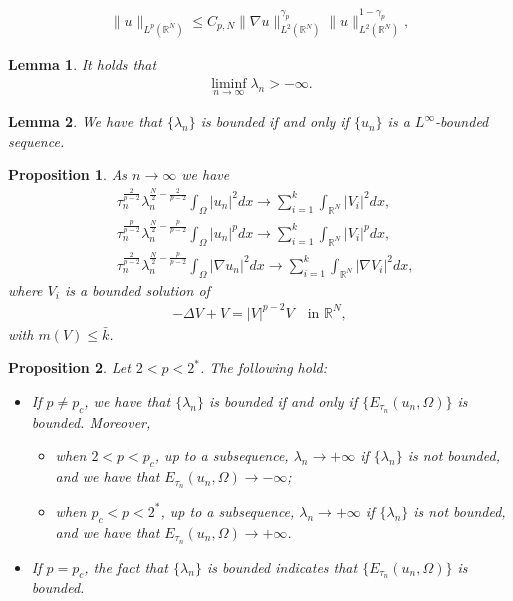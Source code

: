 \documentclass[10pt,a4paper]{amsart}
\newtheorem{lemma}{Lemma}
\newtheorem{proposition}{Proposition}
\newcommand{\R}{\mathbb{R}}
\newcommand{\ga}{\gamma}
\newcommand{\la}{\lambda}
\begin{document}
\begin{align} \label{eqgninequality}
	\|u\|_{L^p(\R^N)} \le C_{p,N}\|\nabla u\|_{L^2(\R^N)}^{\ga_p} \|u\|_{L^2(\R^N)}^{1-\ga_p},
\end{align}

\begin{lemma} \label{lemlanbelow}
	It holds that
	\begin{align*}
		\liminf_{n \to \infty}\la_n > -\infty.
	\end{align*}
\end{lemma}

\begin{lemma} \label{lemlanbounded}
	We have that $\{\la_n\}$ is bounded if and only if $\{u_n\}$ is a $L^\infty$-bounded sequence.
\end{lemma}

\begin{proposition} \label{propasm}
	As $n \to \infty$ we have
	\begin{align}
		& \tau_n^{\frac{2}{p-2}}\la_n^{\frac{N}{2} - \frac{2}{p-2}} \int_\Omega |u_n|^2dx \to \sum_{i = 1}^{k}\int_{\R^N} |V_i|^2dx, \label{eqntoinftyun2} \\
		& \tau_n^{\frac{p}{p-2}}\la_n^{\frac{N}{2} - \frac{p}{p-2}} \int_\Omega |u_n|^pdx \to \sum_{i = 1}^{k}\int_{\R^N} |V_i|^pdx, \\
		& \tau_n^{\frac{2}{p-2}}\la_n^{\frac{N}{2} - \frac{p}{p-2}}\int_\Omega |\nabla u_n|^2dx \to \sum_{i = 1}^{k}\int_{\R^N} |\nabla V_i|^2dx,
	\end{align}
    where $V_i$ is a bounded solution of
    \begin{align} \label{equationV}
    	-\Delta V + V = |V|^{p-2}V \quad \text{in } \R^N,
    \end{align}
    with $m(V) \leq \bar k$.
\end{proposition}

\begin{proposition} \label{proprelationship}
	Let $2 < p < 2^*$. The following hold:
	\begin{itemize}
		\item[(1)] If $p \neq p_c$, we have that $\{\la_n\}$ is bounded if and only if $\{E_{\tau_n}(u_n,\Omega)\}$ is bounded. Moreover,
		\begin{itemize}
			\item when $2 < p < p_c$, up to a subsequence, $\la_n \to +\infty$ if $\{\la_n\}$ is not bounded, and we have that $E_{\tau_n}(u_n,\Omega) \to -\infty$;
			\item when $p_c < p < 2^*$, up to a subsequence, $\la_n \to +\infty$ if $\{\la_n\}$ is not bounded, and we have that $E_{\tau_n}(u_n,\Omega) \to +\infty$.
		\end{itemize}
		\item[(2)] If $p = p_c$, the fact that $\{\la_n\}$ is bounded indicates that $\{E_{\tau_n}(u_n,\Omega)\}$ is bounded.
	\end{itemize}
	
\end{proposition}
\end{document}
